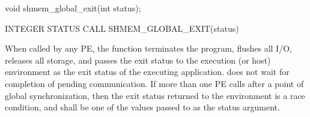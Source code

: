 \synC
void shmem_global_exit(int status); %

\synF
INTEGER STATUS
CALL SHMEM_GLOBAL_EXIT(status) %


{
       When called by any  \ac{PE}, the   function terminates the 
       \openshmem program, \color{red} flushes all I/O, releases all storage, \color{black}and passes the 
       exit status to the execution (or host) environment as the exit status of the executing application. 
         does not wait for completion of pending communication. 
       If more than one \ac{PE} calls   after a point of global 
       synchronization, then the exit status returned to the environment is a race condition, 
       and shall be one of the values passed to  as the status 
       argument.
}
{
}
\eAPI
